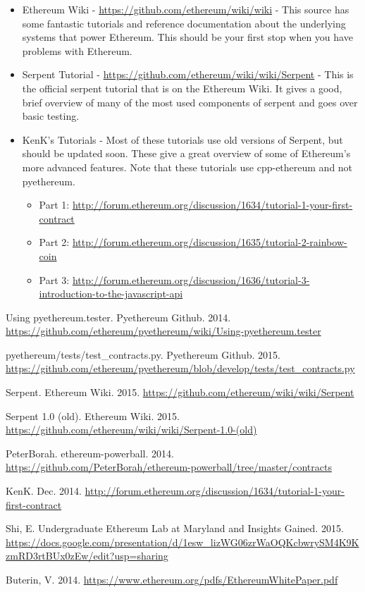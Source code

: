 \documentclass[12pt]{article}
\begin{document}
\begin{itemize}
	\item Ethereum Wiki - \url{https://github.com/ethereum/wiki/wiki} - This source has some fantastic tutorials and reference documentation about the underlying systems that power Ethereum. This should be your first stop when you have problems with Ethereum.
	\item Serpent Tutorial - \url{https://github.com/ethereum/wiki/wiki/Serpent} - This is the official serpent tutorial that is on the Ethereum Wiki. It gives a good, brief overview of many of the most used components of serpent and goes over basic testing.
	\item KenK's Tutorials - Most of these tutorials use old versions of Serpent, but should be updated soon. These give a great overview of some of Ethereum's more advanced features. Note that these tutorials use cpp-ethereum and not pyethereum.
	\begin{itemize}
	\item Part 1: \url{http://forum.ethereum.org/discussion/1634/tutorial-1-your-first-contract}
	\item Part 2: \url{http://forum.ethereum.org/discussion/1635/tutorial-2-rainbow-coin}
	\item Part 3: \url{http://forum.ethereum.org/discussion/1636/tutorial-3-introduction-to-the-javascript-api}
	\end{itemize}
\end{itemize}

\begin{thebibliography}{9}

	Using pyethereum.tester. Pyethereum Github. 2014. \url{https://github.com/ethereum/pyethereum/wiki/Using-pyethereum.tester}

	pyethereum/tests/test\_contracts.py. Pyethereum Github. 2015. \url{https://github.com/ethereum/pyethereum/blob/develop/tests/test_contracts.py}

	Serpent. Ethereum Wiki. 2015. \url{https://github.com/ethereum/wiki/wiki/Serpent}

	Serpent 1.0 (old). Ethereum Wiki. 2015. \url{https://github.com/ethereum/wiki/wiki/Serpent-1.0-(old)}

	PeterBorah. ethereum-powerball. 2014. \url{https://github.com/PeterBorah/ethereum-powerball/tree/master/contracts}

	KenK. Dec. 2014. \url{http://forum.ethereum.org/discussion/1634/tutorial-1-your-first-contract}

	Shi, E. Undergraduate Ethereum Lab at Maryland and Insights Gained. 2015. \url{https://docs.google.com/presentation/d/1esw_lizWG06zrWaOQKcbwrySM4K9KzmRD3rtBUx0zEw/edit?usp=sharing}

	Buterin, V. 2014. \url{https://www.ethereum.org/pdfs/EthereumWhitePaper.pdf}

\end{thebibliography}
\end{document}
